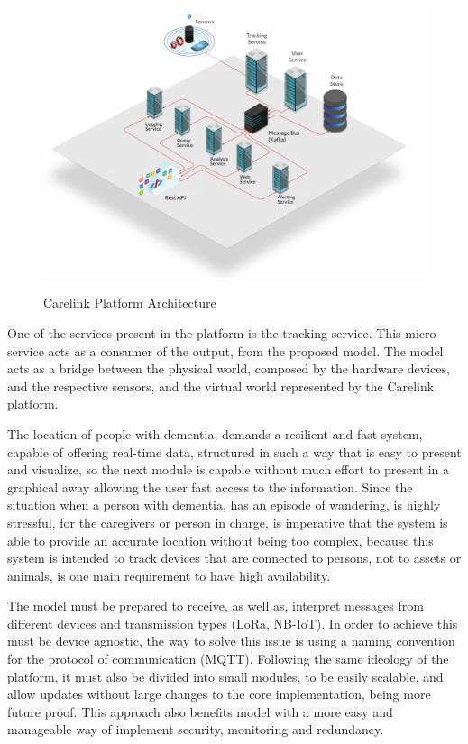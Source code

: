 \begin{figure}[htbp]
  \centering
  
    {\includegraphics[width=1\linewidth]{Chapters/Figures/Carelink-Diagrams-1024x724.png}}%
 
  \caption{Carelink Platform Architecture~\cite{carelink}}
  \label{fig:Platform_Archictecture}
\end{figure}
One of the services present in the platform is the tracking service. This micro-service acts as a consumer of the output, from the proposed model. 
The model acts as a bridge between the physical world, composed by the hardware devices, and the respective sensors, and the virtual world represented by the Carelink platform.

The location of people with dementia, demands a resilient and fast system, capable of offering real-time data, structured in such a way that is easy to present and visualize, so the next module is capable without much effort to present in a graphical away allowing the user fast access to the information.
Since the situation when a person with dementia, has an episode of wandering, is highly stressful, for the caregivers or person in charge, is imperative that the system is able to provide an accurate location without being too complex, because this system is intended to track devices that are connected to persons, not to assets or animals, is one main requirement to have high availability.\newline\newline


The model must be prepared to receive, as well as, interpret messages from different devices and transmission types (LoRa, NB-IoT). In order to achieve this must be device agnostic, the way to solve this issue is using a naming convention for the protocol of communication (MQTT). 
Following the same ideology of the platform, it must also be divided into small modules, to be easily scalable, and allow updates without large changes to the core implementation, being more future proof. This approach also benefits model with a more easy and manageable way of implement security, monitoring and redundancy.

